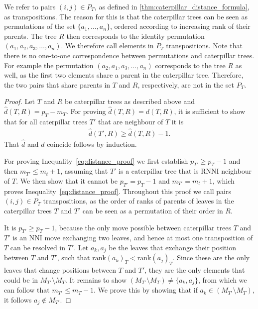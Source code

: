 \documentclass[11pt]{amsart}
\newcommand{\rnni}{\mathrm{RNNI}}
\newcommand{\rank}{\mathrm{rank}}
\newcommand{\nni}{\mathrm{NNI}}
\begin{document}
We refer to pairs $(i,j) \in P_T$, as defined in \autoref{thm:caterpillar_distance_formula}, as transpositions.
The reason for this is that the caterpillar trees can be seen as permutations of the set $\{a_1, \ldots, a_n\}$, ordered according to increasing rank of their parents.
The tree $R$ then corresponds to the identity permutation $(a_1, a_2, a_3, \ldots, a_n)$.
We therefore call elements in $P_T$ transpositions.
Note that there is no one-to-one correspondence between permutations and caterpillar trees.
For example the permutation $(a_2, a_1, a_3, \ldots, a_n)$ corresponds to the tree $R$ as well, as the first two elements share a parent in the caterpillar tree.
Therefore, the two pairs that share parents in $T$ and $R$, respectively, are not in the set $P_T$.

\begin{proof}
	Let $T$ and $R$ be caterpillar trees as described above and $\hat d(T,R) = p_T - m_T$.
	For proving $\hat d(T,R) = d(T,R)$, it is sufficient to show that for all caterpillar trees $T'$ that are neighbour of $T$ it is
	\begin{align}
		\hat d(T',R) \geq \hat d(T,R) - 1.
		\label{eq:distance_proof}
	\end{align}
	That $\hat d$ and $d$ coincide follows by induction.

	For proving Inequality~\ref{eq:distance_proof} we first establish $p_{T'} \geq p_T - 1$ and then $m_{T'} \leq m_t + 1$, assuming that $T'$ is a caterpillar tree that is $\rnni$ neighbour of $T$.
	We then show that it cannot be $p_{T'} = p_T - 1$ and $m_{T'} = m_t + 1$, which proves Inequality~\ref{eq:distance_proof}.
	Throughout this proof we call pairs $(i,j) \in P_T$ transpositions, as the order of ranks of parents of leaves in the caterpillar trees $T$ and $T'$ can be seen as a permutation of their order in $R$.

	It is $p_{T'} \geq p_T - 1$, because the only move possible between caterpillar trees $T$ and $T'$ is an $\nni$ move exchanging two leaves, and hence at most one transposition of $T$ can be resolved in $T'$.
	Let $a_k, a_j$ be the leaves that exchange their position between $T$ and $T'$, such that $\rank(a_k)_T < \rank(a_j)_T$.
	Since these are the only leaves that change positions between $T$ and $T'$, they are the only elements that could be in $M_{T'} \setminus M_T$.
	It remains to show $(M_{T'} \setminus M_T) \neq \{a_k, a_j\}$, from which we can follow that $m_{T'} \leq m_T - 1$.
	We prove this by showing that if $a_k \in (M_{T'} \setminus M_T)$, it follows $a_j \notin M_{T'}$.


\end{proof}
\end{document}
